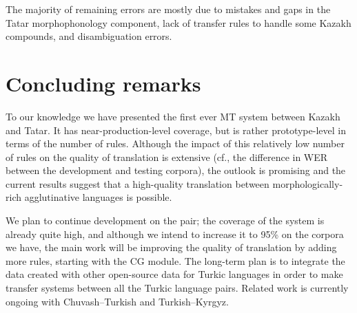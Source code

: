 \documentclass[a4paper,11pt]{article}
\newenvironment{itemise}[1]{
        \begin{itemize}[itemsep=-0.3em,leftmargin=1em,itemindent=0em]
        \vspace{-0.6em}
        #1
}{
        \end{itemize}
        \vspace{-2pt}
}
\begin{document}


The majority of remaining errors are mostly due to mistakes and gaps in the Tatar morphophonology component, lack of transfer rules to handle some Kazakh compounds, and disambiguation errors.



\section{Concluding remarks}
\label{sec:conc}

To our knowledge we have presented the first ever MT system between Kazakh and Tatar. It has near-production-level
coverage, but is rather prototype-level in terms of the number of rules.  Although the impact of this relatively low number of rules on the
quality of translation is extensive (cf., the difference in WER between the development and testing corpora), the outlook is promising and the current results suggest
that a high-quality translation between morphologically-rich agglutinative languages is possible.

We plan to continue development on the pair; the coverage of the system is already quite high, and although we intend to
increase it to 95\% on the corpora we have, the main work will be improving the quality of translation by adding
more rules, starting with the CG module.
The long-term plan is to integrate the data created with other open-source data for Turkic languages in order to make
transfer systems between all the Turkic language pairs.  Related work is currently ongoing with Chuvash--Turkish and Turkish--Kyrgyz.
\end{document}
